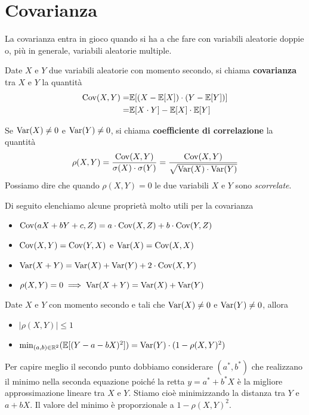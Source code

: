 \section{Covarianza}
La covarianza entra in gioco quando si ha a che fare con variabili aleatorie doppie o, più in
generale, variabili aleatorie multiple.

\begin{definition}
	Date $X$ e $Y$ due variabili aleatorie con momento secondo, si chiama \textbf{covarianza} tra
	$X$ e $Y$ la quantità
	\begin{align*}
		\operatorname{Cov}(X, Y) = & \mathbb{E}[(X - \mathbb{E}[X]) \cdot (Y - \mathbb{E}[Y])] \\
		=            & \mathbb{E}[X \cdot Y] - \mathbb{E}[X] \cdot \mathbb{E}[Y]
	\end{align*}
\end{definition}

\begin{definition}
	Se $\operatorname{Var}(X) \neq 0$ e $\operatorname{Var}(Y) \neq 0$, si chiama \textbf{coefficiente di correlazione} la
	quantità
	\[
		\rho(X,Y) = \frac{\operatorname{Cov}(X, Y)}{\sigma(X) \cdot \sigma(Y)}
		= \frac{\operatorname{Cov}(X, Y)}{\sqrt{\operatorname{Var}(X) \cdot \operatorname{Var}(Y)}}
	\]
	Possiamo dire che quando $\rho(X,Y) = 0$ le due variabili $X$ e $Y$ sono \emph{scorrelate}.
\end{definition}

Di seguito elenchiamo alcune proprietà molto utili per la covarianza
\begin{itemize}
	\item $\operatorname{Cov}(aX + bY + c, Z) = a \cdot \operatorname{Cov}(X, Z) + b \cdot \operatorname{Cov}(Y, Z)$
	\item $\operatorname{Cov}(X,Y) = \operatorname{Cov}(Y,X)$ e $\operatorname{Var}(X) = \operatorname{Cov}(X, X)$
	\item $\operatorname{Var}(X+Y) = \operatorname{Var}(X) + \operatorname{Var}(Y) + 2 \cdot \operatorname{Cov}(X, Y)$
	\item $\rho(X,Y) = 0 \implies \operatorname{Var}(X + Y) = \operatorname{Var}(X) + \operatorname{Var}(Y)$
\end{itemize}

\begin{proposition}
	Date $X$ e $Y$ con momento secondo e tali che $\operatorname{Var}(X) \neq 0$ e $\operatorname{Var}(Y) \neq 0$, allora
	\begin{itemize}
		\item $|\rho(X,Y)| \leq 1$
		\item $\min_{(a,b) \in \mathbb{R}^2} (\mathbb{E}[(Y - a - bX)^2]) = \operatorname{Var}(Y) \cdot (1 - \rho(X,Y)^2)$
	\end{itemize}
\end{proposition}

Per capire meglio il secondo punto dobbiamo considerare $(a^*,b^*)$ che realizzano il minimo
nella seconda equazione poiché la retta $y = a^* + b^* X$ è la migliore approssimazione lineare tra
$X$ e $Y$. Stiamo cioè minimizzando la distanza tra $Y$ e $a+bX$. Il valore del minimo è
proporzionale a $1 - \rho(X,Y)^2$.


